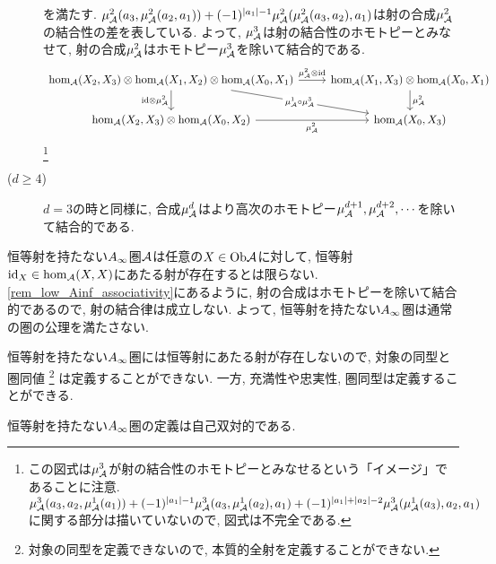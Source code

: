 \documentclass[uplatex, a4paper, 14Q, dvipdfmx]{jsarticle}
\begin{document}
\begin{remark}
\begin{description}
    を満たす. 
    $\mu^2_{\mathcal{A}}(a_3, \mu^2_{\mathcal{A}}(a_2,a_1)) + (-1)^{|a_1|-1} \mu^2_{\mathcal{A}}(\mu^2_{\mathcal{A}}(a_3,a_2), a_1)$は射の合成$\mu^2_{\mathcal{A}}$の結合性の差を表している. 
    よって, $\mu^3_{\mathcal{A}}$は射の結合性のホモトピーとみなせて, 射の合成$\mu^2_{\mathcal{A}}$はホモトピー$\mu^3_{\mathcal{A}}$を除いて結合的である.
    \[\begin{tikzcd}
      {\hom_\A(X_2,X_3) \otimes \hom_\A(X_1,X_2) \otimes \hom_\A(X_0,X_1)} & {\hom_\A(X_1,X_3) \otimes \hom_\A(X_0,X_1)} \\
      {\hom_\A(X_2,X_3) \otimes \hom_\A(X_0,X_2)} & {\hom_\A(X_0,X_3)}
      \arrow["{\mu^2_\A \otimes \id}", from=1-1, to=1-2]
      \arrow["{\mu^2_\A}", from=1-2, to=2-2]
      \arrow["{\id \otimes \mu^2_\A}"', from=1-1, to=2-1]
      \arrow["{\mu^2_\A}"', from=2-1, to=2-2]
      \arrow["{\mu^1_\A \circ \mu^3_\A}"{description}, from=1-1, to=2-2]
    \end{tikzcd}\]
    \footnote{
      この図式は$\mu^3_{\mathcal{A}}$が射の結合性のホモトピーとみなせるという「イメージ」であることに注意. 
      $\mu^3_{\mathcal{A}}(a_3, a_2, \mu^1_{\mathcal{A}}(a_1)) + (-1)^{|a_1|-1} \mu^3_{\mathcal{A}}(a_3, \mu^1_{\mathcal{A}}(a_2), a_1) + (-1)^{|a_1|+|a_2|-2} \mu^3_{\mathcal{A}}(\mu^1_{\mathcal{A}}(a_3), a_2, a_1)$に関する部分は描いていないので, 図式は不完全である. 
    }
    \item[($d \geq 4$)] $d=3$の時と同様に, 合成$\mu^d_{\mathcal{A}}$はより高次のホモトピー$\mu^{d+1}_{\mathcal{A}},\mu^{d+2}_{\mathcal{A}},\cdots$を除いて結合的である. 
  \end{description}
\end{remark}

\begin{remark}
  恒等射を持たない$A_{\infty}$圏$\mathcal{A}$は任意の$X \in \mathrm{Ob}\mathcal{A}$に対して, 恒等射$\mathrm{id}_X \in \hom_{\mathcal{A}}(X,X)$にあたる射が存在するとは限らない. 
  \cref{rem_low_Ainf_associativity}にあるように, 射の合成はホモトピーを除いて結合的であるので, 射の結合律は成立しない. 
  よって, 恒等射を持たない$A_{\infty}$圏は通常の圏の公理を満たさない. 
\end{remark}

\begin{remark}
  恒等射を持たない$A_{\infty}$圏には恒等射にあたる射が存在しないので, 対象の同型と圏同値
  \footnote{
    対象の同型を定義できないので, 本質的全射を定義することができない. 
  }
  は定義することができない. 
  一方, 充満性や忠実性, 圏同型は定義することができる. 
\end{remark}

恒等射を持たない$A_{\infty}$圏の定義は自己双対的である. 
\end{document}
